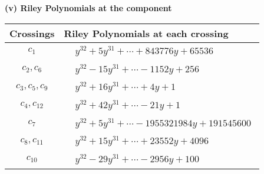 \documentclass[1p]{elsarticle_modified}
\theoremstyle{definition}
\begin{document}
\flushleft \textbf{(v) Riley Polynomials at the component}\newline \\
\begin{tabular}{m{50pt}|m{274pt}}
Crossings & \hspace{64pt}Riley Polynomials at each crossing \\
\hline $$\begin{aligned}c_{1}\end{aligned}$$&$\begin{aligned}
&y^{32}+5 y^{31}+\cdots+843776 y+65536
\end{aligned}$\\
\hline $$\begin{aligned}c_{2},c_{6}\end{aligned}$$&$\begin{aligned}
&y^{32}-15 y^{31}+\cdots-1152 y+256
\end{aligned}$\\
\hline $$\begin{aligned}c_{3},c_{5},c_{9}\end{aligned}$$&$\begin{aligned}
&y^{32}+16 y^{31}+\cdots+4 y+1
\end{aligned}$\\
\hline $$\begin{aligned}c_{4},c_{12}\end{aligned}$$&$\begin{aligned}
&y^{32}+42 y^{31}+\cdots-21 y+1
\end{aligned}$\\
\hline $$\begin{aligned}c_{7}\end{aligned}$$&$\begin{aligned}
&y^{32}+5 y^{31}+\cdots-1955321984 y+191545600
\end{aligned}$\\
\hline $$\begin{aligned}c_{8},c_{11}\end{aligned}$$&$\begin{aligned}
&y^{32}+15 y^{31}+\cdots+23552 y+4096
\end{aligned}$\\
\hline $$\begin{aligned}c_{10}\end{aligned}$$&$\begin{aligned}
&y^{32}-29 y^{31}+\cdots-2956 y+100
\end{aligned}$\\
\hline
\end{tabular}\\~\\
\end{document}
